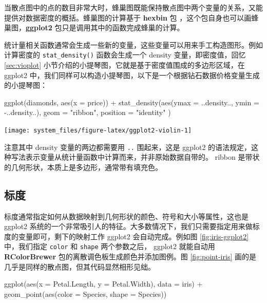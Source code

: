 \documentclass[
  b5paper,
  UTF8,twoside]{book}
\newenvironment{Shaded}{\begin{snugshade}}{\end{snugshade}}
\newcommand{\AttributeTok}[1]{\textcolor[rgb]{0.77,0.63,0.00}{#1}}
\newcommand{\FunctionTok}[1]{\textcolor[rgb]{0.00,0.00,0.00}{#1}}
\newcommand{\NormalTok}[1]{#1}
\newcommand{\SpecialCharTok}[1]{\textcolor[rgb]{0.00,0.00,0.00}{#1}}
\newcommand{\StringTok}[1]{\textcolor[rgb]{0.31,0.60,0.02}{#1}}
\begin{document}
当散点图中的点的数目非常大时，蜂巢图既能保持散点图中两个变量的关系，又能提供对数据密度的概括。蜂巢图的计算基于 \textbf{hexbin} 包 \citep{hexbin}，这个包自身也可以画蜂巢图，\textbf{ggplot2} 包只是调用其中的函数完成蜂巢的计算。

统计量相关函数通常会生成一些新的变量，这些变量可以用来手工构造图形。例如计算密度的 \texttt{stat\_density()} 函数会生成一个 density 变量，即密度值，回忆 \ref{sec:vioplot} 小节介绍的小提琴图，它就是基于密度值围成的多边形区域，在 ggplot2 中，我们同样可以构造小提琴图，以下是一个根据钻石数据价格变量生成的小提琴图：

\begin{Shaded}
\begin{Highlighting}[]
\FunctionTok{ggplot}\NormalTok{(diamonds, }\FunctionTok{aes}\NormalTok{(}\AttributeTok{x =}\NormalTok{ price)) }\SpecialCharTok{+}
  \FunctionTok{stat\_density}\NormalTok{(}\FunctionTok{aes}\NormalTok{(}\AttributeTok{ymax =}\NormalTok{ ..density.., }\AttributeTok{ymin =} \SpecialCharTok{{-}}\NormalTok{..density..),}
    \AttributeTok{geom =} \StringTok{"ribbon"}\NormalTok{, }\AttributeTok{position =} \StringTok{"identity"}
\NormalTok{  )}
\end{Highlighting}
\end{Shaded}

\begin{center}\texttt{[image: system\_files/figure-latex/ggplot2-violin-1]} \end{center}

注意其中 density 变量的两边都需要用 \texttt{..} 围起来，这是 ggplot2 的语法规定，这种写法表示变量从统计量函数中计算而来，并非原始数据自带的。 ribbon 是带状的几何形状，本质上是多边形，通常带有填充色。

\hypertarget{ux6807ux5ea6}{%
\subsection{标度}\label{ux6807ux5ea6}}

标度通常指定如何从数据映射到几何形状的颜色、符号和大小等属性，这也是 ggplot2 系统的一个非常吸引人的特征。大多数情况下，我们只需要指定用来做标度的变量即可，剩下的映射工作 ggplot2 会自动完成。例如图 \ref{fig:iris-ggplot2} 中，我们指定 \texttt{color} 和 \texttt{shape} 两个参数之后， ggplot2 就能自动用 \textbf{RColorBrewer} 包的离散调色板生成颜色并添加图例。图 \ref{fig:point-iris} 画的是几乎是同样的散点图，但其代码显然相形见绌。

\begin{Shaded}
\begin{Highlighting}[]
\FunctionTok{ggplot}\NormalTok{(}\FunctionTok{aes}\NormalTok{(}\AttributeTok{x =}\NormalTok{ Petal.Length, }\AttributeTok{y =}\NormalTok{ Petal.Width), }\AttributeTok{data =}\NormalTok{ iris) }\SpecialCharTok{+}
  \FunctionTok{geom\_point}\NormalTok{(}\FunctionTok{aes}\NormalTok{(}\AttributeTok{color =}\NormalTok{ Species, }\AttributeTok{shape =}\NormalTok{ Species))}
\end{Highlighting}
\end{Shaded}
\end{document}
